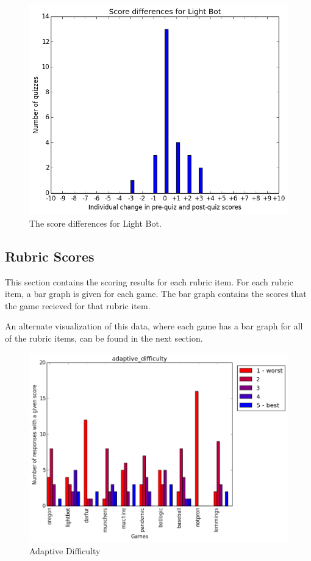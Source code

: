 			\begin{figure}[h] 
			\centering 
			\includegraphics[height=0.33\textheight]{lightbot_results.png} 
			\caption{The score differences for Light Bot.}
			\end{figure}







\cleardoublepage

		\subsection{Rubric Scores}
			This section contains the scoring results for each rubric item. For each rubric item, a bar graph is given for each game. The bar graph contains the scores that the game recieved for that rubric item.

			An alternate visualization of this data, where each game has a bar graph for all of the rubric items, can be found in the next section.

			\begin{figure}[h] 
			\centering 
			\includegraphics[height=0.33\textheight]{adaptive_difficulty_scores.png} 
			\caption{Adaptive Difficulty}
			\end{figure}

